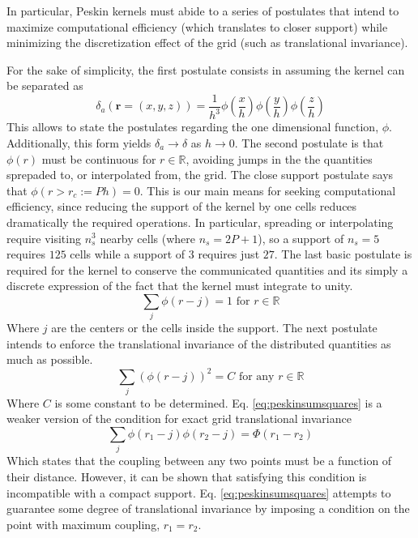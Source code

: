 \documentclass[ twoside,openright,titlepage,numbers=noenddot,%
headinclude,footinclude,cleardoublepage=empty,abstract=on,
BCOR=5mm,paper=a4,fontsize=11pt, dvipsnames
]{scrreprt}
\renewcommand{\vec}[1]{\bm{#1}}
\begin{document}
In particular, Peskin kernels must abide to a series of postulates that intend to maximize computational efficiency (which translates to closer support) while minimizing the discretization effect of the grid (such as translational invariance).

For the sake of simplicity, the first postulate consists in assuming the kernel can be separated as
\begin{equation}
  \label{eq:peskinseparable}
  \delta_a(\vec{r}=(x,y,z)) =\frac{1}{h^3}\phi\left(\frac{x}{h}\right)\phi\left(\frac{y}{h}\right)\phi\left(\frac{z}{h}\right)
\end{equation}
This allows to state the postulates regarding the one dimensional function, $\phi$. Additionally, this form yields $\delta_a\rightarrow\delta$ as $h\rightarrow 0$.
The second postulate is that $\phi(r)$ must be continuous for $r\in\mathbb R$, avoiding jumps in the the quantities sprepaded to, or interpolated from, the grid. The close support postulate says that $\phi(r>r_c := Ph) = 0$. This is our main means for seeking computational efficiency, since reducing the support of the kernel by one cells reduces dramatically the required operations. In particular, spreading or interpolating require visiting $n_s^3$ nearby cells (where $n_s = 2P +1$), so a support of $n_s=5$ requires $125$ cells while a support of $3$ requires just $27$.
The last basic postulate is required for the kernel to conserve the communicated quantities and its simply a discrete expression of the fact that the kernel must integrate to unity.
\begin{equation}
  \label{eq:peskinunity}
  \sum_j \phi(r-j) = 1 \textrm{ for } r\in\mathbb R
\end{equation}
Where $j$ are the centers or the cells inside the support.
The next postulate intends to enforce the translational invariance of the distributed quantities as much as possible.
\begin{equation}
  \label{eq:peskinsumsquares}
  \sum_j\left(\phi(r-j)\right)^2 = C \textrm{ for any } r\in\mathbb R
\end{equation}
Where $C$ is some constant to be determined. Eq. \eqref{eq:peskinsumsquares} is a weaker version of the condition for exact grid translational invariance
\begin{equation}
  \sum_j\phi(r_1-j)\phi(r_2-j) = \Phi(r_1-r_2)
\end{equation}
Which states that the coupling between any two points must be a function of their distance. However, it can be shown that satisfying this condition is incompatible with a compact support\cite{Peskin2002}. Eq. \eqref{eq:peskinsumsquares} attempts to guarantee some degree of translational invariance by imposing a condition on the point with maximum coupling, $r_1 = r_2$.
\end{document}
